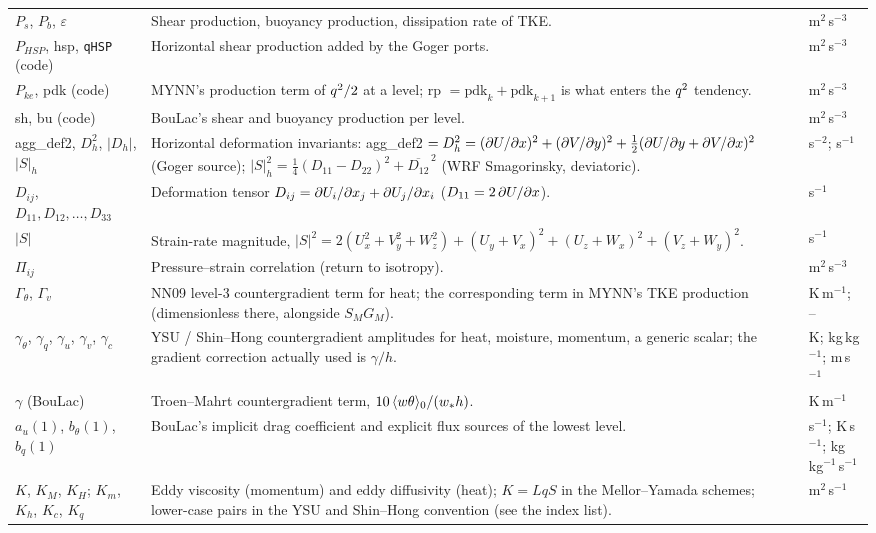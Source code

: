 \begin{xltabular}{\linewidth}{@{}>{\raggedright\arraybackslash}p{3.6cm} >{\raggedright\arraybackslash}X >{\raggedright\arraybackslash}p{2.3cm}@{}}
$P_s$, $P_b$, $\varepsilon$ & Shear production, buoyancy production, dissipation rate of TKE. & m$^2$\,s$^{-3}$ \\
$P_{HSP}$, hsp, \texttt{qHSP} (code) & Horizontal shear production added by the Goger ports. & m$^2$\,s$^{-3}$ \\
$P_{ke}$, pdk (code) & MYNN's production term of $q^{2}/2$ at a level; rp $= \mathrm{pdk}_k + \mathrm{pdk}_{k+1}$ is what enters the $q^{2}$ tendency. & m$^2$\,s$^{-3}$ \\
sh, bu (code) & BouLac's shear and buoyancy production per level. & m$^2$\,s$^{-3}$ \\
agg\_def2, $D_h^2$, $|D_h|$, $|S|_h$ & Horizontal deformation invariants: agg\_def2 $= D_h^2 = (\partial U/\partial x)^2 + (\partial V/\partial y)^2 + \tfrac12(\partial U/\partial y + \partial V/\partial x)^2$ (Goger source); $|S|_h^2 = \tfrac14(D_{11} - D_{22})^2 + \overline{D_{12}}^{\,2}$ (WRF Smagorinsky, deviatoric). & s$^{-2}$; s$^{-1}$ \\
$D_{ij}$, $D_{11}, D_{12}, \ldots, D_{33}$ & Deformation tensor $D_{ij} = \partial U_i/\partial x_j + \partial U_j/\partial x_i$ ($D_{11} = 2\,\partial U/\partial x$). & s$^{-1}$ \\
$|S|$ & Strain-rate magnitude, $|S|^2 = 2(U_x^2 + V_y^2 + W_z^2) + (U_y + V_x)^2 + (U_z + W_x)^2 + (V_z + W_y)^2$. & s$^{-1}$ \\
$\Pi_{ij}$ & Pressure--strain correlation (return to isotropy). & m$^2$\,s$^{-3}$ \\
$\Gamma_\theta$, $\Gamma_v$ & NN09 level-3 countergradient term for heat; the corresponding term in MYNN's TKE production (dimensionless there, alongside $S_M G_M$). & K\,m$^{-1}$; -- \\
$\gamma_\theta$, $\gamma_q$, $\gamma_u$, $\gamma_v$, $\gamma_c$ & YSU / Shin--Hong countergradient amplitudes for heat, moisture, momentum, a generic scalar; the gradient correction actually used is $\gamma/h$. & K; kg\,kg$^{-1}$; m\,s$^{-1}$ \\
$\gamma$ (BouLac) & Troen--Mahrt countergradient term, $10\,\langle w\theta \rangle_0/(w_* h)$. & K\,m$^{-1}$ \\
$a_u(1)$, $b_\theta(1)$, $b_q(1)$ & BouLac's implicit drag coefficient and explicit flux sources of the lowest level. & s$^{-1}$; K\,s$^{-1}$; kg\,kg$^{-1}$\,s$^{-1}$ \\
$K$, $K_M$, $K_H$; $K_m$, $K_h$, $K_c$, $K_q$ & Eddy viscosity (momentum) and eddy diffusivity (heat); $K = L q S$ in the Mellor--Yamada schemes; lower-case pairs in the YSU and Shin--Hong convention (see the index list). & m$^2$\,s$^{-1}$ \\

\end{xltabular}
